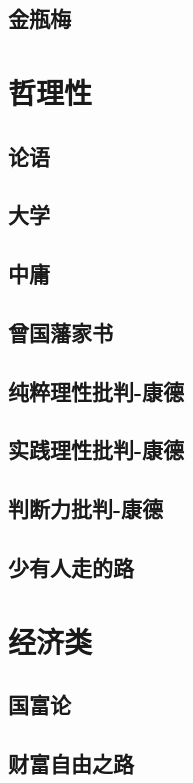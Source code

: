 \documentclass[UTF8,a4paper,12pt]{ctexbook}
\begin{document}
	\section{金瓶梅}
	
\chapter{哲理性}
	\section{论语}

	\section{大学}
	
	\section{中庸}
	
	\section{曾国藩家书}
	
	\section{纯粹理性批判-康德}
	
	\section{实践理性批判-康德}
	
	\section{判断力批判-康德}
	
	\section{少有人走的路}
\chapter{经济类}
	\section{国富论}
	
	\section{财富自由之路}
\end{document}
